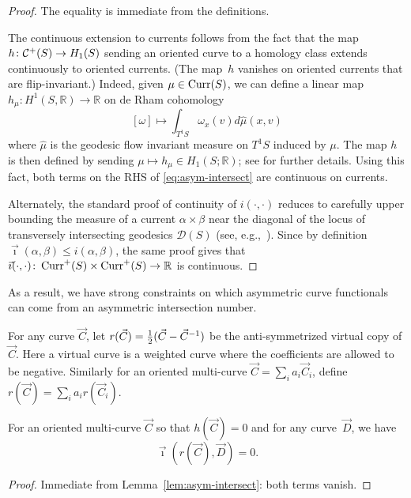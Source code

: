 \begin{proof}
  The equality is 
  immediate from the definitions.

  The continuous extension to currents follows from the fact that the map
  $h \colon \mathcal{C}^+(S) \to H_1(S)$ sending an oriented curve to a
  homology class extends continuously to
  oriented currents.
  (The map~$h$ vanishes on oriented currents that are flip-invariant.) Indeed, given $\mu \in \operatorname{Curr}(S)$, we can define a linear map  $h_\mu \colon H^1(S,\mathbb{R})\to \mathbb{R}$ on de Rham cohomology
  \[
  [\omega] \mapsto \int_{T^1 S} \omega_x(v)d\hat{\mu}(x,v)
  \]
  where $\hat{\mu}$ is the geodesic flow invariant measure on
  $T^1 S$
  induced by $\mu$. The map $h$ is then defined by sending $\mu
  \mapsto h_\mu \in
  H_1(S;\mathbb{R})$; see
  \cite{Schwartzman:AsymptoticCycles,RuelleSullivan:CurrentsFlowsDiffeomorphisms}
  for further
  details.
  Using this fact, both terms on the RHS of \eqref{eq:asym-intersect}
  are continuous on currents.

  Alternately, the standard proof of continuity of $i(\cdot,\cdot)$
  reduces to carefully upper
bounding the measure of a current $\alpha \times \beta$ near the
diagonal of the locus of transversely intersecting geodesics
$\mathcal{D}(S)$ (see,
e.g.,~\cite[Theorem~8.2.21]{Martelli16:IntroGeoTop}).
Since by definition $\vec\imath(\alpha,\beta) \leq i(\alpha,\beta)$,
the same
proof gives that $\vec\imath(\cdot,\cdot) \colon \operatorname{Curr}^+(S) \times
\operatorname{Curr}^+(S) \to \mathbb{R}$ is continuous.
\end{proof}

As a result, we have strong constraints on which asymmetric curve
functionals can come from an asymmetric intersection number.

For any curve $\vec C$, let
$r(\vec C) = {\textstyle \frac{1}{2}}(\vec C - \vec C^{-1})$ be the anti-symmetrized
virtual copy of $\vec C$. Here a virtual curve is a weighted
curve where the coefficients are allowed to be negative. Similarly
for an oriented multi-curve $\vec C = \sum_i a_i \vec C_i$, define
$r(\vec C) = \sum_i a_i r(\vec C_i)$.
\begin{proposition}\label{prop:asym-constraint}
  For an oriented multi-curve $\vec C$ so that $h(\vec C) = 0$ and for
  any curve~$\vec D$, we have
  \[
    \vec{\imath}(r(\vec{C}), \vec D) = 0.
  \]
\end{proposition}
\begin{proof}
  Immediate from Lemma~\ref{lem:asym-intersect}: both terms vanish.
\end{proof}

